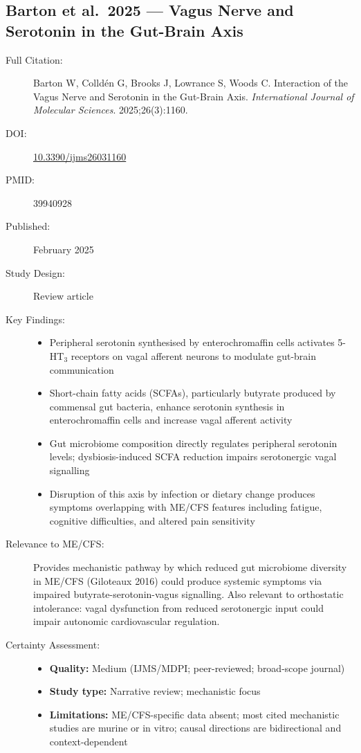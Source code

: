 \subsection{Barton et al.\ 2025 --- Vagus Nerve and Serotonin in the Gut-Brain Axis}

\begin{description}
    \item[Full Citation:] Barton W, Colldén G, Brooks J, Lowrance S, Woods C. Interaction of the Vagus Nerve and Serotonin in the Gut-Brain Axis. \textit{International Journal of Molecular Sciences}. 2025;26(3):1160.
    \item[DOI:] \href{https://doi.org/10.3390/ijms26031160}{10.3390/ijms26031160}
    \item[PMID:] 39940928
    \item[Published:] February 2025
    \item[Study Design:] Review article
    \item[Key Findings:]
    \begin{itemize}
        \item Peripheral serotonin synthesised by enterochromaffin cells activates 5-HT$_3$ receptors on vagal afferent neurons to modulate gut-brain communication
        \item Short-chain fatty acids (SCFAs), particularly butyrate produced by commensal gut bacteria, enhance serotonin synthesis in enterochromaffin cells and increase vagal afferent activity
        \item Gut microbiome composition directly regulates peripheral serotonin levels; dysbiosis-induced SCFA reduction impairs serotonergic vagal signalling
        \item Disruption of this axis by infection or dietary change produces symptoms overlapping with ME/CFS features including fatigue, cognitive difficulties, and altered pain sensitivity
    \end{itemize}
    \item[Relevance to ME/CFS:] Provides mechanistic pathway by which reduced gut microbiome diversity in ME/CFS (Giloteaux 2016) could produce systemic symptoms via impaired butyrate-serotonin-vagus signalling. Also relevant to orthostatic intolerance: vagal dysfunction from reduced serotonergic input could impair autonomic cardiovascular regulation.
    \item[Certainty Assessment:]
    \begin{itemize}
        \item \textbf{Quality:} Medium (IJMS/MDPI; peer-reviewed; broad-scope journal)
        \item \textbf{Study type:} Narrative review; mechanistic focus
        \item \textbf{Limitations:} ME/CFS-specific data absent; most cited mechanistic studies are murine or in vitro; causal directions are bidirectional and context-dependent
    \end{itemize}
\end{description}

